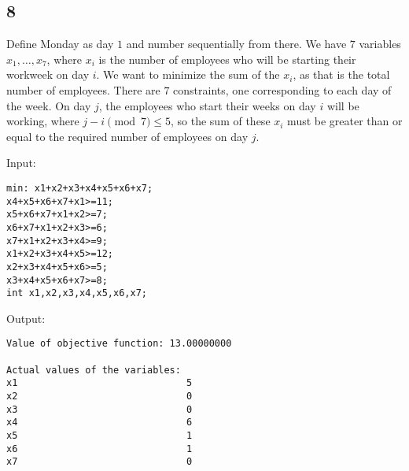 \documentclass{article}
\begin{document}
\subsection*{8}
Define Monday as day $1$ and number sequentially from there. We have $7$ variables $x_1,\ldots,x_7$, where $x_i$ is the number of employees who will be starting their workweek on day $i$. We want to minimize the sum of the $x_i$, as that is the total number of employees. There are $7$ constraints, one corresponding to each day of the week. On day $j$, the employees who start their weeks on day $i$ will be working, where $j-i\pmod{7}\leq5$, so the sum of these $x_i$ must be greater than or equal to the required number of employees on day $j$.

\noindent Input:
\begin{verbatim}
min: x1+x2+x3+x4+x5+x6+x7;
x4+x5+x6+x7+x1>=11;
x5+x6+x7+x1+x2>=7;
x6+x7+x1+x2+x3>=6;
x7+x1+x2+x3+x4>=9;
x1+x2+x3+x4+x5>=12;
x2+x3+x4+x5+x6>=5;
x3+x4+x5+x6+x7>=8;
int x1,x2,x3,x4,x5,x6,x7;
\end{verbatim}
Output:
\begin{verbatim}
Value of objective function: 13.00000000

Actual values of the variables:
x1                              5
x2                              0
x3                              0
x4                              6
x5                              1
x6                              1
x7                              0
\end{verbatim}
\end{document}

